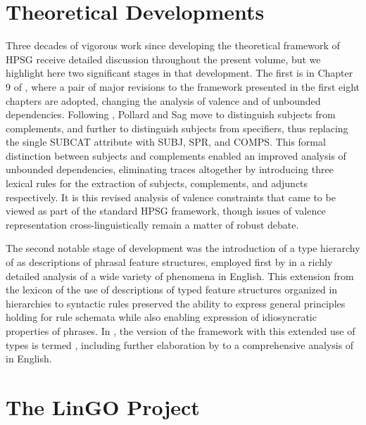 \documentclass[output=paper]{langsci/langscibook}
\begin{document}
\section{Theoretical Developments}

Three decades of vigorous work since \cite{ps} developing the theoretical framework of HPSG receive detailed discussion throughout the present volume, but we highlight here two significant stages in that development.  The first is in Chapter 9 of \cite{ps2}, where a pair of major revisions to the framework presented in the first eight chapters are adopted, changing the analysis of valence and of unbounded dependencies.  Following \citet{Borsley87,Borsley88b-u,Borsley89,Borsley90a}, Pollard and Sag move to distinguish subjects from complements, and further to distinguish subjects from specifiers, thus replacing the single SUBCAT attribute with SUBJ, SPR, and COMPS.  This formal distinction between subjects and complements enabled an improved analysis of unbounded dependencies, eliminating traces altogether by introducing three lexical rules for the extraction of subjects, complements, and adjuncts respectively.   It is this revised analysis of valence constraints that came to be viewed as part of the standard HPSG framework, though issues of valence representation cross-linguistically remain a matter of robust debate.

The second notable stage of development was the introduction of a type hierarchy of {\em {}} as descriptions of phrasal feature structures, employed first by \citet{Sag97a} in a richly detailed analysis of a wide variety of  phenomena in English.  This extension from the lexicon of the use of descriptions of typed feature structures organized in hierarchies to syntactic rules preserved the ability to express general principles holding for rule schemata while also enabling expression of idiosyncratic properties of phrases.  In , the version of the framework with this extended use of types is termed {\em {}}, including further elaboration by \citet{GSag2000a-u} to a comprehensive analysis of  in English.  

\section{The LinGO Project}
\end{document}
